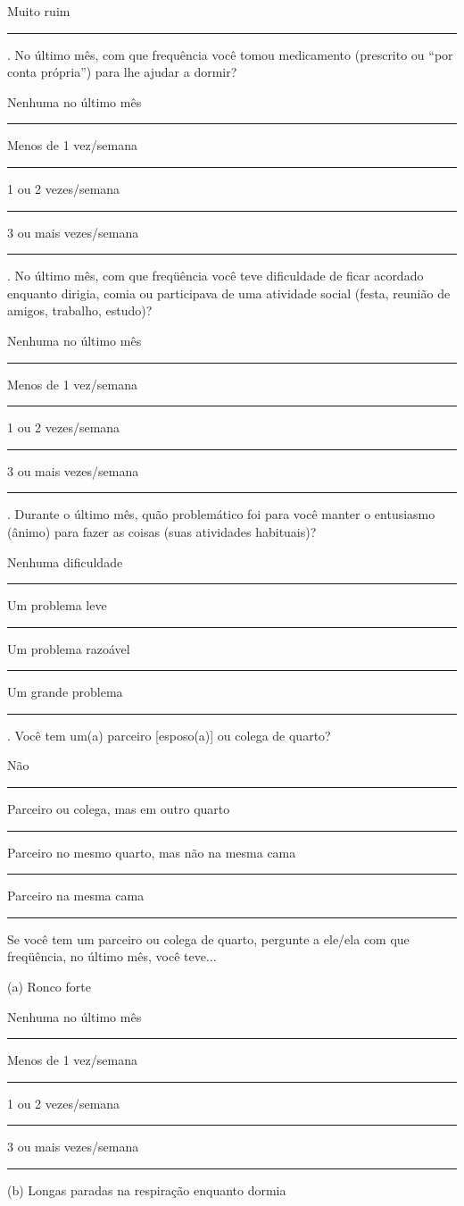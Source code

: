 \documentclass[chapter=TITLE,
               oneside,
               12pt,
               a4paper,
               english,
               brazil]{abntex2}    %
\begin{document}
\begin{anexosenv}
    Muito ruim \rule{0.75cm}{0.4pt}

    . No último mês, com que frequência você tomou medicamento (prescrito ou
    ``por conta própria'') para lhe ajudar a dormir?

    Nenhuma no último mês \rule{0.75cm}{0.4pt} Menos de 1 vez/semana \rule{0.75cm}{0.4pt}

    1 ou 2 vezes/semana \rule{0.75cm}{0.4pt} 3 ou mais vezes/semana \rule{0.75cm}{0.4pt}

    . No último mês, com que freqüência você teve dificuldade de ficar acordado
    enquanto dirigia, comia ou participava de uma atividade social (festa, reunião
    de amigos, trabalho, estudo)?

    Nenhuma no último mês \rule{0.75cm}{0.4pt} Menos de 1 vez/semana \rule{0.75cm}{0.4pt}

    1 ou 2 vezes/semana \rule{0.75cm}{0.4pt} 3 ou mais vezes/semana \rule{0.75cm}{0.4pt}

    . Durante o último mês, quão problemático foi para você manter o entusiasmo
    (ânimo) para fazer as coisas (suas atividades habituais)?

    Nenhuma dificuldade \rule{0.75cm}{0.4pt}

    Um problema leve \rule{0.75cm}{0.4pt}

    Um problema razoável \rule{0.75cm}{0.4pt}

    Um grande problema \rule{0.75cm}{0.4pt}

    . Você tem um(a) parceiro [esposo(a)] ou colega de quarto?

    Não \rule{0.75cm}{0.4pt}

    Parceiro ou colega, mas em outro quarto \rule{0.75cm}{0.4pt}

    Parceiro no mesmo quarto, mas não na mesma cama \rule{0.75cm}{0.4pt}

    Parceiro na mesma cama \rule{0.75cm}{0.4pt}

    \noindent
    Se você tem um parceiro ou colega de quarto, pergunte a ele/ela com que
    freqüência, no último mês, você teve...

    \noindent
    (a) Ronco forte

    Nenhuma no último mês \rule{0.75cm}{0.4pt} Menos de 1 vez/semana \rule{0.75cm}{0.4pt}

    1 ou 2 vezes/semana \rule{0.75cm}{0.4pt} 3 ou mais vezes/semana \rule{0.75cm}{0.4pt}

    \noindent
    (b) Longas paradas na respiração enquanto dormia


\end{anexosenv}
\end{document}
